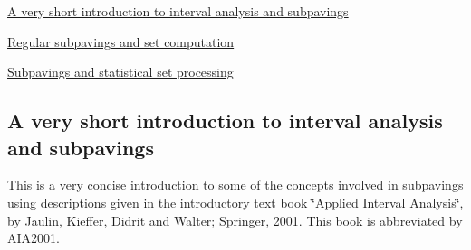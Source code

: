 
\begin{DoxyItemize}
\item \hyperlink{pavproc_intro}{\-A very short introduction to interval analysis and subpavings}
\item \hyperlink{pavproc_setcomputation}{\-Regular subpavings and set computation}
\item \hyperlink{pavproc_statssetprocessing}{\-Subpavings and statistical set processing}
\end{DoxyItemize}



\hypertarget{pavproc_intro}{}\subsection{\-A very short introduction to interval analysis and subpavings}\label{pavproc_intro}
\-This is a very concise introduction to some of the concepts involved in subpavings using descriptions given in the introductory text book \char`\"{}\-Applied Interval Analysis\char`\"{}, by \-Jaulin, \-Kieffer, \-Didrit and \-Walter; \-Springer, 2001. \-This book is abbreviated by \-A\-I\-A2001.

